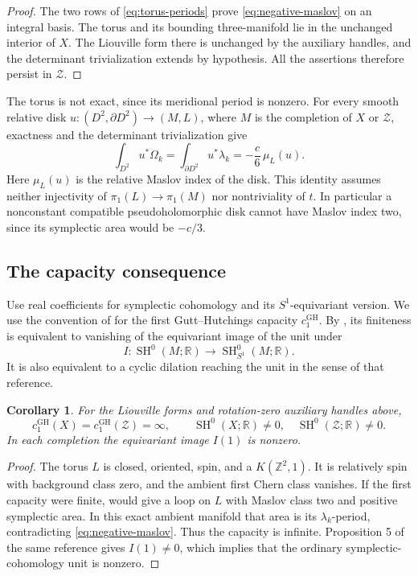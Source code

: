 \documentclass[11pt]{amsart}
\newtheorem{corollary}[theorem]{Corollary}
\theoremstyle{definition}
\theoremstyle{remark}
\newcommand{\Z}{\mathbb Z}
\begin{document}
\begin{proof}
The two rows of \eqref{eq:torus-periods} prove
\eqref{eq:negative-maslov} on an integral basis. The torus and its
bounding three-manifold lie in the unchanged interior of $X$.
The Liouville form there is unchanged by the auxiliary handles,
and the determinant trivialization extends by hypothesis. All the
assertions therefore persist in $\mathcal Z$.
\end{proof}

The torus is not exact, since its meridional period is nonzero.
For every smooth relative disk $u:(D^2,\partial D^2)\to(M,L)$,
where $M$ is the completion of $X$ or $\mathcal Z$, exactness and
the determinant trivialization give
\begin{equation}\label{eq:disk-negative-maslov}
 \int_{D^2}u^*\Omega_k
    =\int_{\partial D^2}u^*\lambda_k
    =-\frac{c}{6}\,\mu_L(u).
\end{equation}
Here $\mu_L(u)$ is the relative Maslov index of the disk.
This identity assumes neither injectivity of $\pi_1(L)\to\pi_1(M)$
nor nontriviality of $t$. In particular a nonconstant compatible
pseudoholomorphic disk cannot have Maslov index two, since its
symplectic area would be $-c/3$.

\subsection{The capacity consequence}

Use real coefficients for symplectic cohomology and its
$S^1$-equivariant version. We use the convention of \cite{Li26}
for the first Gutt--Hutchings capacity $c_1^{\mathrm{GH}}$.
By \cite[Proposition 5]{Li26}, its finiteness is equivalent to
vanishing of the equivariant image of the unit under
\[
 I:\operatorname{SH}^0(M;\mathbb R)
                    \longrightarrow\operatorname{SH}_{S^1}^0(M;\mathbb R).
\]
It is also equivalent to a cyclic dilation reaching the unit in the
sense of that reference.

\begin{corollary}\label{cor:capacity}
For the Liouville forms and rotation-zero auxiliary handles above,
\[
 c_1^{\mathrm{GH}}(X)=c_1^{\mathrm{GH}}(\mathcal Z)=\infty,
 \qquad
 \operatorname{SH}^0(X;\mathbb R)\ne0,
 \quad\operatorname{SH}^0(\mathcal Z;\mathbb R)\ne0.
\]
In each completion the equivariant image $I(1)$ is nonzero.
\end{corollary}
\begin{proof}
The torus $L$ is closed, oriented, spin, and a $K(\Z^2,1)$.
It is relatively spin with background class zero, and the ambient
first Chern class vanishes. If the first capacity were finite,
\cite[Corollary 8]{Li26} would give a loop on $L$ with Maslov
class two and positive symplectic area. In this exact ambient
manifold that area is its $\lambda_k$-period, contradicting
\eqref{eq:negative-maslov}. Thus the capacity is infinite.
Proposition 5 of the same reference gives $I(1)\ne0$, which
implies that the ordinary symplectic-cohomology unit is nonzero.
\end{proof}
\end{document}
